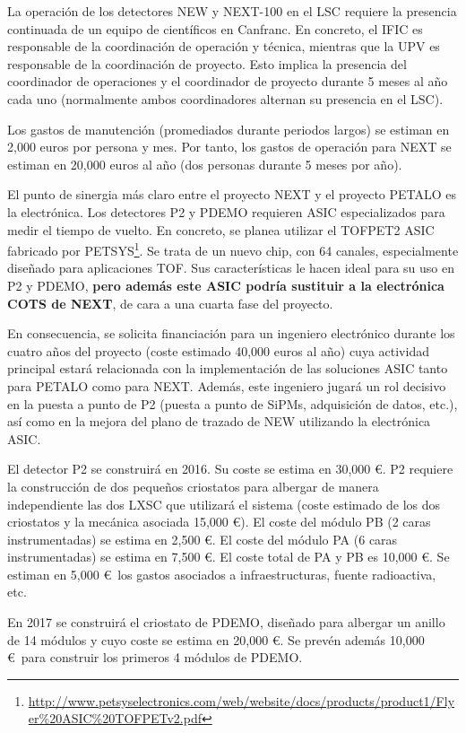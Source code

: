La operación de los detectores NEW y NEXT-100 en el LSC requiere la presencia continuada de un equipo de científicos en Canfranc. En concreto, el IFIC es responsable de la coordinación de operación y técnica, mientras que la UPV es responsable de la coordinación de proyecto. Esto implica la presencia del coordinador de operaciones y el coordinador de proyecto durante 5 meses al año cada uno (normalmente ambos coordinadores alternan su presencia en el LSC). 

Los gastos de manutención (promediados durante periodos largos) se estiman en 2,000 euros por persona y mes. Por tanto, los gastos de operación para NEXT se estiman en 20,000 euros al año (dos personas durante 5 meses por año). 

El punto de sinergia más claro entre el proyecto NEXT y el proyecto PETALO es la electrónica. Los detectores P2 y PDEMO requieren ASIC especializados para medir el tiempo de vuelto. En concreto, se planea utilizar el 
TOFPET2 ASIC fabricado por PETSYS\footnote{\url{http://www.petsyselectronics.com/web/website/docs/products/product1/Flyer\%20ASIC\%20TOFPETv2.pdf}}. Se trata de un nuevo chip, con 64 canales, especialmente diseñado para aplicaciones TOF. Sus características le hacen ideal para su uso en P2 y PDEMO, {\bf pero además este ASIC podría sustituir a la electrónica COTS de NEXT}, de cara a una cuarta fase del proyecto. 

En consecuencia, se solicita financiación para un ingeniero electrónico durante los cuatro años del proyecto (coste estimado 40,000 euros al año) cuya actividad principal estará relacionada con la implementación de las soluciones ASIC tanto para PETALO como para NEXT. Además, este ingeniero jugará un rol decisivo en la puesta a punto de P2 (puesta a punto de SiPMs, adquisición de datos, etc.), así como en la mejora del plano de trazado de NEW utilizando la electrónica ASIC. 

El detector P2 se construirá en 2016. Su coste se estima en 30,000 \euro. P2 requiere la construcción de dos pequeños criostatos para albergar de manera independiente las dos LXSC que utilizará el sistema (coste estimado de los dos criostatos y la mecánica asociada 15,000 \euro). El coste del módulo PB (2 caras instrumentadas) se estima en 2,500 \euro. El coste del módulo PA (6 caras instrumentadas) se estima en 7,500 \euro. El coste total de PA y PB es 10,000 \euro. Se estiman en 5,000 \euro\ los gastos asociados a infraestructuras, fuente radioactiva, etc. 

En 2017 se construirá el criostato de PDEMO, diseñado para albergar un anillo de 14 módulos y cuyo coste se estima en 20,000 \euro. Se prevén además 10,000 \euro\ para construir los primeros 4 módulos de PDEMO.

